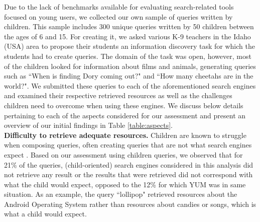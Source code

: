 \documentclass{sig-alternate-05-2015}
\begin{document}
Due to the lack of benchmarks available for evaluating search-related tools focused on young users, we collected our own sample of queries written by children. This sample includes 300 unique queries written by 50 children between the ages of 6 and 15. For creating it, we asked various K-9   teachers in the Idaho (USA) area to propose their students an information discovery task for which the students had to create queries. The domain of the task was open, however, most of the children looked for information about films and animals, generating queries such as ``When is finding Dory coming out?" and ``How many cheetahs are in the world?".   We submitted these queries to each of the aforementioned search engines and examined their respective retrieved resources as well as the challenges children need to overcome when using these engines. We discuss below details pertaining to each of the aspects  considered for our assessment and present an overview of our initial findings  in Table \ref{table:aspects}. \\





\noindent
\textbf{Difficulty to retrieve adequate resources.} Children are known to struggle when composing queries, often creating queries that are not what search engines expect \cite{Rie16}. Based on our assessment using children queries, we observed that for  21\% of the queries, (child-oriented) search engines considered in this analysis did not retrieve any result or the results that were retrieved did not correspond with what the child would expect, opposed to the 12\% for which YUM was in same situation. As an example, the query ``lollipop" retrieved resources about the Android Operating System rather than resources about candies or songs, which is what a child would expect.  %
\\
\end{document}
